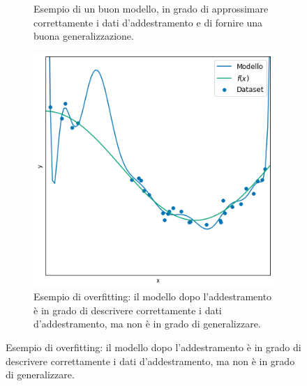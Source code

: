 \documentclass[../../main.tex]{subfiles}
\begin{document}
\begin{figure}[H]
\begin{subfigure}[t]{0.30\textwidth}
        \caption{Esempio di un buon modello, in grado di approssimare correttamente i dati d'addestramento e di fornire una buona generalizzazione.}
    \end{subfigure}
    \begin{subfigure}[t]{0.30\textwidth}
        \centering
        \includegraphics[width=\textwidth]{immagini/4_2/4_2_3/over.png}
        \caption{Esempio di overfitting: il modello dopo l'addestramento è in grado di descrivere correttamente i dati d'addestramento, ma non è in grado di generalizzare.}
    \end{subfigure}
\end{figure}
\end{document}
